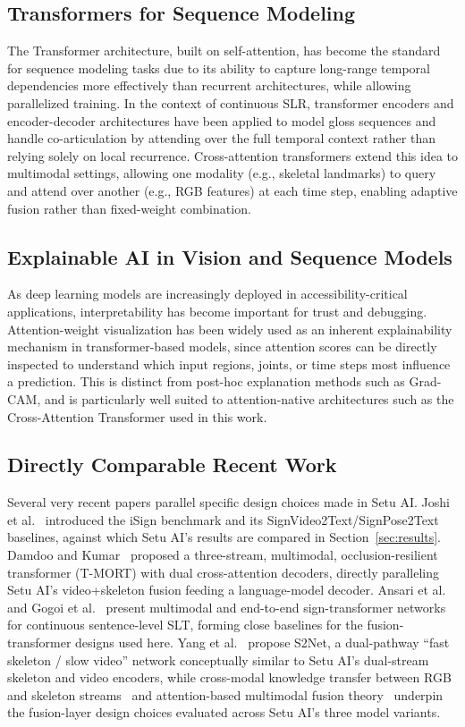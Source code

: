 \documentclass[pdflatex,sn-mathphys-num]{sn-jnl}
\begin{document}
\subsection{Transformers for Sequence Modeling}
The Transformer architecture, built on self-attention, has become the standard for sequence modeling tasks due to its ability to capture long-range temporal dependencies more effectively than recurrent architectures, while allowing parallelized training. In the context of continuous SLR, transformer encoders and encoder-decoder architectures have been applied to model gloss sequences and handle co-articulation by attending over the full temporal context rather than relying solely on local recurrence. Cross-attention transformers extend this idea to multimodal settings, allowing one modality (e.g., skeletal landmarks) to query and attend over another (e.g., RGB features) at each time step, enabling adaptive fusion rather than fixed-weight combination.

\subsection{Explainable AI in Vision and Sequence Models}
As deep learning models are increasingly deployed in accessibility-critical applications, interpretability has become important for trust and debugging. Attention-weight visualization has been widely used as an inherent explainability mechanism in transformer-based models, since attention scores can be directly inspected to understand which input regions, joints, or time steps most influence a prediction. This is distinct from post-hoc explanation methods such as Grad-CAM, and is particularly well suited to attention-native architectures such as the Cross-Attention Transformer used in this work.

\subsection{Directly Comparable Recent Work}
Several very recent papers parallel specific design choices made in Setu AI. Joshi et al.~\cite{isign} introduced the iSign benchmark and its SignVideo2Text/SignPose2Text baselines, against which Setu AI's results are compared in Section~\ref{sec:results}. Damdoo and Kumar~\cite{tmort} proposed a three-stream, multimodal, occlusion-resilient transformer (T-MORT) with dual cross-attention decoders, directly paralleling Setu AI's video+skeleton fusion feeding a language-model decoder. Ansari et al.~\cite{ansari} and Gogoi et al.~\cite{gogoi} present multimodal and end-to-end sign-transformer networks for continuous sentence-level SLT, forming close baselines for the fusion-transformer designs used here. Yang et al.~\cite{s2net} propose S2Net, a dual-pathway ``fast skeleton / slow video'' network conceptually similar to Setu AI's dual-stream skeleton and video encoders, while cross-modal knowledge transfer between RGB and skeleton streams~\cite{crossmodal} and attention-based multimodal fusion theory~\cite{statattn} underpin the fusion-layer design choices evaluated across Setu AI's three model variants.
\end{document}
